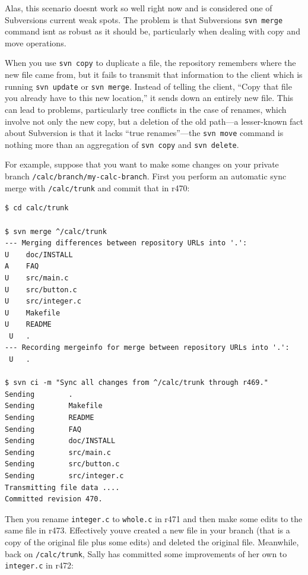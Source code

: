 Alas, this scenario doesn\textquotesingle t work so well right now and
is considered one of Subversion\textquotesingle s current weak spots.
The problem is that Subversion\textquotesingle s \texttt{svn\ merge}
command isn\textquotesingle t as robust as it should be, particularly
when dealing with copy and move operations.

When you use \texttt{svn\ copy} to duplicate a file, the repository
remembers where the new file came from, but it fails to transmit that
information to the client which is running \texttt{svn\ update} or
\texttt{svn\ merge}. Instead of telling the client, ``Copy that file you
already have to this new location,'' it sends down an entirely new file.
This can lead to problems, particularly tree conflicts in the case of
renames, which involve not only the new copy, but a deletion of the old
path---a lesser-known fact about Subversion is that it lacks ``true
renames''---the \texttt{svn\ move} command is nothing more than an
aggregation of \texttt{svn\ copy} and \texttt{svn\ delete}.

For example, suppose that you want to make some changes on your private
branch \texttt{/calc/branch/my-calc-branch}. First you perform an
automatic sync merge with \texttt{/calc/trunk} and commit that in r470:

\begin{verbatim}
$ cd calc/trunk

$ svn merge ^/calc/trunk
--- Merging differences between repository URLs into '.':
U    doc/INSTALL
A    FAQ
U    src/main.c
U    src/button.c
U    src/integer.c
U    Makefile
U    README
 U   .
--- Recording mergeinfo for merge between repository URLs into '.':
 U   .

$ svn ci -m "Sync all changes from ^/calc/trunk through r469."
Sending        .
Sending        Makefile
Sending        README
Sending        FAQ
Sending        doc/INSTALL
Sending        src/main.c
Sending        src/button.c
Sending        src/integer.c
Transmitting file data ....
Committed revision 470.
\end{verbatim}

Then you rename \texttt{integer.c} to \texttt{whole.c} in r471 and then
make some edits to the same file in r473. Effectively
you\textquotesingle ve created a new file in your branch (that is a copy
of the original file plus some edits) and deleted the original file.
Meanwhile, back on \texttt{/calc/trunk}, Sally has committed some
improvements of her own to \texttt{integer.c} in r472:

